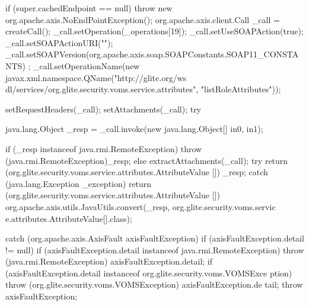 \begin{DoxyCode}
                                                                                 
                                                                                       
                                                 {
        if (super.cachedEndpoint == null) {
            throw new org.apache.axis.NoEndPointException();
        }
        org.apache.axis.client.Call _call = createCall();
        _call.setOperation(_operations[19]);
        _call.setUseSOAPAction(true);
        _call.setSOAPActionURI("");
        _call.setSOAPVersion(org.apache.axis.soap.SOAPConstants.SOAP11_CONSTANTS)
      ;
        _call.setOperationName(new javax.xml.namespace.QName("http://glite.org/ws
      dl/services/org.glite.security.voms.service.attributes", "listRoleAttributes"));

        setRequestHeaders(_call);
        setAttachments(_call);
 try {        java.lang.Object _resp = _call.invoke(new java.lang.Object[] {in0, 
      in1});

        if (_resp instanceof java.rmi.RemoteException) {
            throw (java.rmi.RemoteException)_resp;
        }
        else {
            extractAttachments(_call);
            try {
                return (org.glite.security.voms.service.attributes.AttributeValue
      []) _resp;
            } catch (java.lang.Exception _exception) {
                return (org.glite.security.voms.service.attributes.AttributeValue
      []) org.apache.axis.utils.JavaUtils.convert(_resp, org.glite.security.voms.servic
      e.attributes.AttributeValue[].class);
            }
        }
  } catch (org.apache.axis.AxisFault axisFaultException) {
    if (axisFaultException.detail != null) {
        if (axisFaultException.detail instanceof java.rmi.RemoteException) {
              throw (java.rmi.RemoteException) axisFaultException.detail;
         }
        if (axisFaultException.detail instanceof org.glite.security.voms.VOMSExce
      ption) {
              throw (org.glite.security.voms.VOMSException) axisFaultException.de
      tail;
         }
   }
  throw axisFaultException;
}
    }
\end{DoxyCode}
